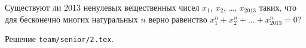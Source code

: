 \problem{}
Существуют ли 2013 ненулевых вещественных чисел
$x_1$, $x_2$, \ldots, $x_{2013}$ таких,
что для бесконечно многих натуральных $n$
верно равенство $x_1^n + x_2^n + \ldots + x_{2013}^n = 0$?

\solution
Решение \texttt{team/senior/2.tex}.
\endproblem

